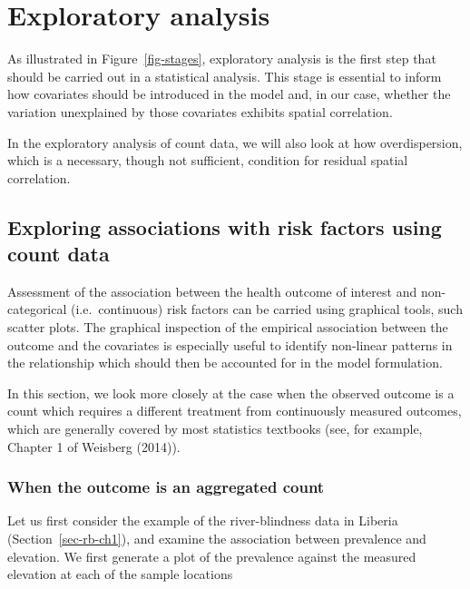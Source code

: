\documentclass[
  letterpaper,
]{krantz}
\begin{document}
\hypertarget{exploratory-analysis}{%
\section{Exploratory analysis}\label{exploratory-analysis}}

As illustrated in Figure~\ref{fig-stages}, exploratory analysis is the
first step that should be carried out in a statistical analysis. This
stage is essential to inform how covariates should be introduced in the
model and, in our case, whether the variation unexplained by those
covariates exhibits spatial correlation.

In the exploratory analysis of count data, we will also look at how
overdispersion, which is a necessary, though not sufficient, condition
for residual spatial correlation.

\hypertarget{sec-expl-assoc}{%
\subsection{Exploring associations with risk factors using count
data}\label{sec-expl-assoc}}

Assessment of the association between the health outcome of interest and
non-categorical (i.e.~continuous) risk factors can be carried using
graphical tools, such scatter plots. The graphical inspection of the
empirical association between the outcome and the covariates is
especially useful to identify non-linear patterns in the relationship
which should then be accounted for in the model formulation.

In this section, we look more closely at the case when the observed
outcome is a count which requires a different treatment from
continuously measured outcomes, which are generally covered by most
statistics textbooks (see, for example, Chapter 1 of Weisberg (2014)).

\hypertarget{when-the-outcome-is-an-aggregated-count}{%
\subsubsection{When the outcome is an aggregated
count}\label{when-the-outcome-is-an-aggregated-count}}

Let us first consider the example of the river-blindness data in Liberia
(Section~\ref{sec-rb-ch1}), and examine the association between
prevalence and elevation. We first generate a plot of the prevalence
against the measured elevation at each of the sample locations
\end{document}
